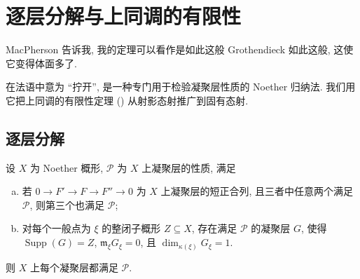 \section{逐层分解与上同调的有限性}\label{src:A.5}
\begin{epigraph}
MacPherson 告诉我, 我的定理可以看作是如此这般 Grothendieck 如此这般, 这使它变得体面多了.
\end{epigraph}
 在法语中意为 ``拧开'', 是一种专门用于检验凝聚层性质的 Noether 归纳法. 我们用它把上同调的有限性定理 () 从射影态射推广到固有态射.

\subsection{逐层分解}\label{src:A.5.1-subsection}
\begin{proposition}[逐层分解]\label{src:A.5.1}
设 $X$ 为 Noether 概形, $\mathcal P$ 为 $X$ 上凝聚层的性质, 满足
\begin{enumerate}[(a)]
\item 若 $0\to F'\to F\to F''\to0$ 为 $X$ 上凝聚层的短正合列, 且三者中任意两个满足 $\mathcal P$, 则第三个也满足 $\mathcal P$;
\item 对每个一般点为 $\xi$ 的整闭子概形 $Z\subseteq X$, 存在满足 $\mathcal P$ 的凝聚层 $G$, 使得 $\operatorname{Supp}(G)=Z$, $\mathfrak m_\xi G_\xi=0$, 且 $\dim_{\kappa(\xi)}G_\xi=1$.
\end{enumerate}
则 $X$ 上每个凝聚层都满足 $\mathcal P$.
\end{proposition}
